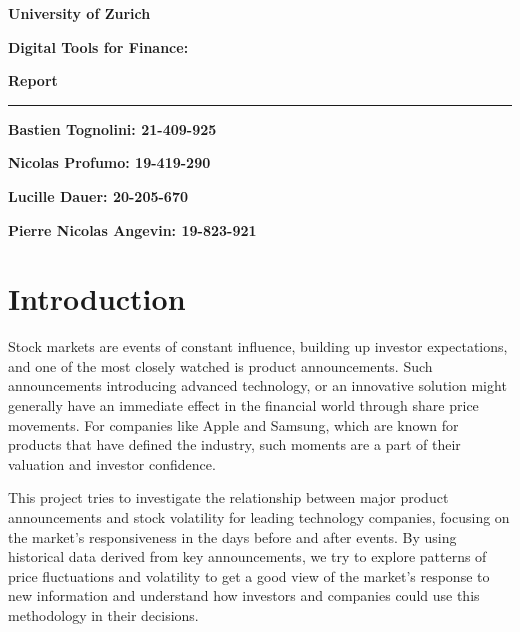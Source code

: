 \documentclass[12pt, oneside]{article}
\begin{document}
\begin{titlepage}
  \begin{center}
    

\huge
\textbf{University of Zurich}
\vspace{0.5cm}

\textbf{Digital Tools for Finance:}

\textbf{Report}

\rule{\textwidth}{1pt}
\vspace{1cm}
\large

\textbf{Bastien Tognolini: 21-409-925 }
\vspace{0.5cm}

\textbf{Nicolas Profumo: 19-419-290 }
\vspace{0.5cm}

\textbf{Lucille Dauer: 20-205-670 }
\vspace{0.5cm}

\textbf{Pierre Nicolas Angevin: 19-823-921}




  \end{center}



\end{titlepage}

\begin{center}
\tableofcontents
\end{center}
\newpage


\section{Introduction}
Stock markets are events of constant influence, building up investor expectations, and one of the most closely watched is product announcements. Such announcements introducing advanced technology, or an innovative solution might generally have an immediate effect in the financial world through share price movements. For companies like Apple and Samsung, which are known for products that have defined the industry, such moments are a part of their valuation and investor confidence.

This project tries to investigate the relationship between major product announcements and stock volatility for leading technology companies, focusing on the market's responsiveness in the days before and after events. By using historical data derived from key announcements, we try to explore patterns of price fluctuations and volatility to get a good view of the market's response to new information and understand how investors and companies could use this methodology in their decisions.
\end{document}
